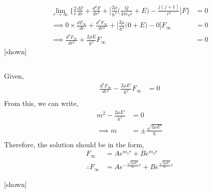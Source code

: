 \documentclass{article}
\begin{document}
\subsection{}%
\large{
    \begin{align*}
    \lim_{r \to \infty}\Bigg\{\frac{2}{r}\frac{dF}{dr}+\frac{d^2F}{dr^2}+\Bigg[\frac{2 \mu}{\hbar^2}\Big(\frac{Q}{4\pi \epsilon_0 r} + E\Big)-\frac{j(j+1)}{r^2}\Bigg]F\Bigg\} &= 0\\
    \implies 0\times \frac{dF_\infty}{dr}+\frac{d^2F_\infty}{dr^2}+\Bigg[\frac{2 \mu}{\hbar^2}\Big(0 + E\Big)-0\Bigg]F_\infty &= 0\\
    \implies \frac{d^2F_\infty}{dr^2}+\frac{2\mu E}{\hbar^2}F_\infty &= 0
\end{align*}
\hspace{13cm}[shown]

}

\vspace{2cm}
\subsection{}%

\large{
    Given,\\
\begin{align*}
    \frac{d^2F_\infty}{dr^2} - \frac{2\mu E'}{\hbar^2}F_\infty &= 0\\
\end{align*}
From this, we can write,
\begin{align*}
    m^2-\frac{2 \mu E'}{\hbar^2} &= 0\\
    \implies m &= \pm \frac{\sqrt{2\mu E'}}{\hbar}\\
\end{align*}
Therefore, the solution should be in the form,
\begin{align*}
    F_\infty &= Ae^{m_1r} + Be^{m_2r}\\
    \therefore F_\infty &= Ae^{-\frac{\sqrt{2\mu E'}}{\hbar}r} + Be^{\frac{\sqrt{2\mu E'}}{\hbar}r}
\end{align*}

\hspace{11cm}[shown]
}

\subsection{}%
\end{document}
